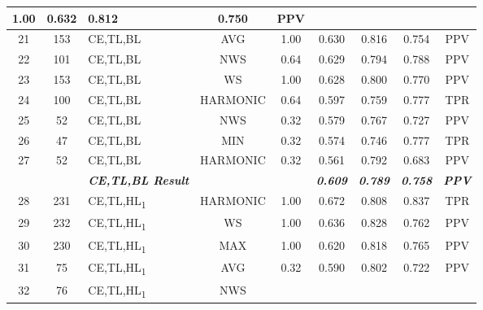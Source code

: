 \begin{table}[H]
{\begin{tabular}{cc|l|cc|c|c|c|c|}
    1.00 &
    0.632 &
    0.812 &
    0.750 &
    PPV \\ \hline
  \multicolumn{1}{|c|}{21} &
    153 &
    CE,TL,BL &
    \multicolumn{1}{c|}{AVG} &
    1.00 &
    0.630 &
    0.816 &
    0.754 &
    PPV \\ \hline
  \multicolumn{1}{|c|}{22} &
    101 &
    CE,TL,BL &
    \multicolumn{1}{c|}{NWS} &
    0.64 &
    0.629 &
    0.794 &
    0.788 &
    PPV \\ \hline
  \multicolumn{1}{|c|}{23} &
    153 &
    CE,TL,BL &
    \multicolumn{1}{c|}{WS} &
    1.00 &
    0.628 &
    0.800 &
    0.770 &
    PPV \\ \hline
  \multicolumn{1}{|c|}{24} &
    100 &
    CE,TL,BL &
    \multicolumn{1}{c|}{HARMONIC} &
    0.64 &
    0.597 &
    0.759 &
    0.777 &
    TPR \\ \hline
  \multicolumn{1}{|c|}{25} &
    52 &
    CE,TL,BL &
    \multicolumn{1}{c|}{NWS} &
    0.32 &
    0.579 &
    0.767 &
    0.727 &
    PPV \\ \hline
  \multicolumn{1}{|c|}{26} &
    47 &
    CE,TL,BL &
    \multicolumn{1}{c|}{MIN} &
    0.32 &
    0.574 &
    0.746 &
    0.777 &
    TPR \\ \hline
  \multicolumn{1}{|c|}{27} &
    52 &
    CE,TL,BL &
    \multicolumn{1}{c|}{HARMONIC} &
    0.32 &
    0.561 &
    0.792 &
    0.683 &
    PPV \\ \hline
   &
     &
    \textit{\textbf{CE,TL,BL Result}} &
     &
     &
    \textit{\textbf{0.609}} &
    \textit{\textbf{0.789}} &
    \textit{\textbf{0.758}} &
    \textit{\textbf{PPV}} \\ \hline
  \multicolumn{1}{|c|}{28} &
    231 &
    CE,TL,HL\textsubscript{1} &
    \multicolumn{1}{c|}{HARMONIC} &
    1.00 &
    0.672 &
    0.808 &
    0.837 &
    TPR \\ \hline
  \multicolumn{1}{|c|}{29} &
    232 &
    CE,TL,HL\textsubscript{1} &
    \multicolumn{1}{c|}{WS} &
    1.00 &
    0.636 &
    0.828 &
    0.762 &
    PPV \\ \hline
  \multicolumn{1}{|c|}{30} &
    230 &
    CE,TL,HL\textsubscript{1} &
    \multicolumn{1}{c|}{MAX} &
    1.00 &
    0.620 &
    0.818 &
    0.765 &
    PPV \\ \hline
  \multicolumn{1}{|c|}{31} &
    75 &
    CE,TL,HL\textsubscript{1} &
    \multicolumn{1}{c|}{AVG} &
    0.32 &
    0.590 &
    0.802 &
    0.722 &
    PPV \\ \hline
  \multicolumn{1}{|c|}{32} &
    76 &
    CE,TL,HL\textsubscript{1} &
    \multicolumn{1}{c|}{NWS} &

\end{tabular}}
\end{table}
